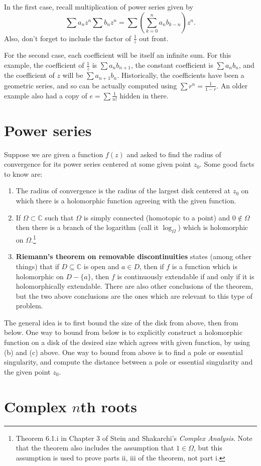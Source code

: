 \documentclass[10pt]{article}
\begin{document}
\begin{enumerate}
	In the first case, recall multiplication of power series given by \[\sum a_n z^n \sum b_n z^n = \sum (\sum_{k=0}^n a_n b_{k-n}) z^n.\] Also, don't forget to include the factor of $\frac{1}{z}$ out front. 
	
	For the second case, each coefficient will be itself an infinite sum. For this example, the coefficient of $\frac{1}{z}$ is $\sum a_n b_{n+1}$, the constant coefficient is $\sum a_n b_n$, and the coefficient of $z$ will be $\sum a_{n+1}b_n$. Historically, the coefficients have been a geometric series, and so can be actually computed using $\sum r^n = \frac{1}{1-r}$. An older example also had a copy of $e =  \sum \frac{1}{n!}$ hidden in there.
\end{enumerate}

\section{Power series}
Suppose we are given a function $f(z)$ and asked to find the radius of convergence for its power series centered at some given point $z_0$. Some good facts to know are:
\begin{enumerate}[label = \alph*)]
\item The radius of convergence is the radius of the largest disk centered at $z_0$ on which there is a holomorphic function agreeing with the given function.
\item If $\Omega \subset \mathbb{C}$ such that $\Omega$ is simply connected (homotopic to a point) and $0 \not \in \Omega$ then there is a branch of the logarithm (call it $\log_\Omega$) which is holomorphic on $\Omega$.\footnote{Theorem 6.1.i in Chapter 3 of Stein and Shakarchi's \textit{Complex Analysis}. Note that the theorem also includes the assumption that $1 \in \Omega$, but this assumption is used to prove parts ii, iii of the theorem, not part i.}
\item \textbf{Riemann's theorem on removable discontinuities} states (among other things) that if $D \subseteq \mathbb{C}$ is open and $a \in D$, then if $f$ is a function which is holomorphic on $D-\{a\}$, then $f$ is continuously extendable if and only if it is holomorphically extendable. There are also other conclusions of the theorem, but the two above conclusions are the ones which are relevant to this type of problem.
\end{enumerate}

The general idea is to first bound the size of the disk from above, then from below. One way to bound from below is to explicitly construct a holomorphic function on a disk of the desired size which agrees with given function, by using (b) and (c) above.
One way to bound from above is to find a pole or essential singularity, and compute the distance between a pole or essential singularity and the given point $z_0$.

\section{Complex $n$th roots}
\end{document}
